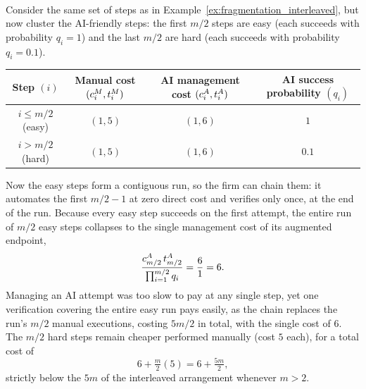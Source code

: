 \documentclass[12pt, final]{article}
\begin{document}
\\[-0.2em]
\noindent{\color{black!25}\rule{\linewidth}{0.4pt}}\par\vspace{1em}
\renewcommand\theexample{\arabic{example}}
\setcounter{example}{2}
\begin{example}
\label{ex:fragmentation_clustered}
Consider the same set of steps as in Example~\ref{ex:fragmentation_interleaved}, but now cluster the AI-friendly steps: the first $m/2$ steps are easy (each succeeds with probability $q_i = 1$) and the last $m/2$ are hard (each succeeds with probability $q_i = 0.1$).
\begin{center}
\begin{tabular}{c|ccc}
\toprule
\makecell{Step\\$(i)$} & \makecell{Manual cost\\$(c^{M}_{i}, t^{M}_{i})$} & \makecell{AI management cost\\$(c^{A}_{i}, t^{A}_{i})$} & \makecell{AI success probability\\$(q_i)$} \\
\midrule
$i \le m/2$ (easy) & $(1, 5)$ & $(1, 6)$ & $1$ \\
$i > m/2$ (hard) & $(1, 5)$ & $(1, 6)$ & $0.1$ \\
\bottomrule
\end{tabular}
\end{center}

\vspace{0.25cm}



Now the easy steps form a contiguous run, so the firm can chain them: it automates the first $m/2 - 1$ at zero direct cost and verifies only once, at the end of the run.
Because every easy step succeeds on the first attempt, the entire run of $m/2$ easy steps collapses to the single management cost of its augmented endpoint,
\[
\frac{c^{A}_{m/2}\,t^{A}_{m/2}}{\prod_{i=1}^{m/2} q_i} = \frac{6}{1} = 6.
\]
Managing an AI attempt was too slow to pay at any single step, yet one verification covering the entire easy run pays easily, as the chain replaces the run's $m/2$ manual executions, costing $5m/2$ in total, with the single cost of $6$.
The $m/2$ hard steps remain cheaper performed manually (cost $5$ each), for a total cost of
\[
6 + \tfrac{m}{2}(5) = 6 + \tfrac{5m}{2},
\]
strictly below the $5m$ of the interleaved arrangement whenever $m > 2$.
\end{example}
\clearpage
\end{document}
